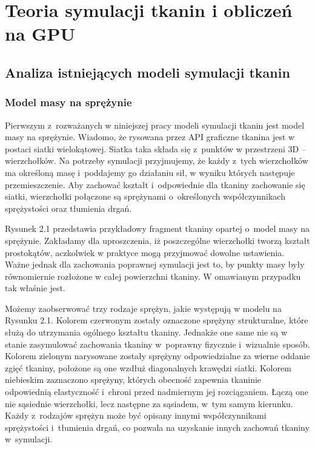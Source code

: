 \chapter{Teoria symulacji tkanin i obliczeń na GPU}
\label{t:teoria}


	\section{Analiza istniejących modeli symulacji tkanin}
	\label{t:teoria:analiza}
	
		\subsection{Model masy na sprężynie}
		\label{t:teoria:analiza:masa}		
			
			Pierwszym z~rozważanych w niniejszej pracy modeli symulacji tkanin jest model masy na sprężynie. Wiadomo, że rysowana przez API graficzne tkanina jest w postaci siatki wielokątowej. Siatka taka składa się z~punktów w przestrzeni 3D -- wierzchołków. Na potrzeby symulacji przyjmujemy, że każdy z~tych wierzchołków ma określoną masę i~poddajemy go działaniu sił, w wyniku których następuje przemieszczenie. Aby zachować kształt i~odpowiednie dla tkaniny zachowanie się siatki, wierzchołki połączone są sprężynami o~określonych współczynnikach sprężystości oraz tłumienia drgań. 
			
			
			
			
			Rysunek 2.1 przedstawia przykładowy fragment tkaniny opartej o~model masy na sprężynie. Zakładamy dla uproszczenia, iż poszczególne wierzchołki tworzą kształt prostokątów, aczkolwiek w praktyce mogą przyjmować dowolne ustawienia. Ważne jednak dla zachowania poprawnej symulacji jest to, by punkty masy były równomiernie rozłożone w całej powierzchni tkaniny. W omawianym przypadku tak właśnie jest. 
			
			Możemy zaobserwować trzy rodzaje sprężyn, jakie występują w modelu na Rysunku 2.1. Kolorem czerwonym zostały oznaczone sprężyny strukturalne, które służą do utrzymania ogólnego kształtu tkaniny. Jednakże one same nie są w stanie zasymulować zachowania tkaniny w~poprawny fizycznie i~wizualnie sposób. Kolorem zielonym narysowane zostały sprężyny odpowiedzialne za wierne oddanie zgięć tkaniny, położone są one wzdłuż diagonalnych krawędzi siatki. Kolorem niebieskim zaznaczono sprężyny, których obecność zapewnia tkaninie odpowiednią elastyczność i~chroni przed nadmiernym jej rozciąganiem. Łączą one nie sąsiednie wierzchołki, lecz następne za sąsiadem, w~tym samym kierunku. Każdy z~rodzajów sprężyn może być opisany innymi współczynnikami sprężystości i~tłumienia drgań, co pozwala na uzyskanie innych zachowań tkaniny w~symulacji.
			
